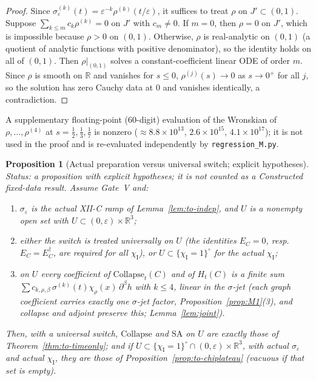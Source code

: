 \documentclass{article}
\newtheorem{proposition}{Proposition}
\theoremstyle{remark}
\newcommand{\sigeps}{\sigma_\varepsilon}
\newcommand{\chiI}{\chi_{\mathrm I}}
\newcommand{\Coll}{\mathrm{Collapse}}
\begin{document}
\begin{proof}
Since $\sigeps^{(k)}(t)=\varepsilon^{-k}\rho^{(k)}(t/\varepsilon)$, it suffices to treat $\rho$ on $J'\subset(0,1)$.
Suppose $\sum_{k\le m}c_k\rho^{(k)}=0$ on $J'$ with $c_m\ne0$.
If $m=0$, then $\rho=0$ on $J'$, which is impossible because $\rho>0$ on $(0,1)$.
Otherwise, $\rho$ is real-analytic on $(0,1)$ (a quotient of analytic functions with positive denominator), so the identity holds on all of $(0,1)$.
Then $\rho|_{(0,1)}$ solves a constant-coefficient linear ODE of order $m$.
Since $\rho$ is smooth on $\mathbb R$ and vanishes for $s\le0$, $\rho^{(j)}(s)\to0$ as $s\to0^+$ for all $j$, so the solution has zero Cauchy data at $0$ and vanishes identically, a contradiction.
\end{proof}
A supplementary floating-point (60-digit) evaluation of the Wronskian of $\rho,\dots,\rho^{(4)}$ at $s=\tfrac12,\tfrac13,\tfrac17$ is nonzero ($\approx8.8\times10^{13}$, $2.6\times10^{15}$, $4.1\times10^{17}$); it is not used in the proof and is re-evaluated independently by \texttt{regression\_M.py}.

\begin{proposition}[Actual preparation versus universal switch; explicit hypotheses]
\label{prop:to-actual}
\emph{Status: a proposition with explicit hypotheses; it is not counted as a Constructed fixed-data result.}
Assume Gate~V and:
\begin{enumerate}
\item[(H1)] $\sigeps$ is the actual XII-C ramp of Lemma~\ref{lem:to-indep}, and $U$ is a nonempty open set with $U\subset(0,\varepsilon)\times\mathbb R^3$;
\item[(H2)] either the switch is treated \emph{universally} on $U$ (the identities $E_C=0$, resp.\ $E_C=E_C^\dagger$, are required for all $\chiI$), or $U\subset\{\chiI=1\}^\circ$ for the actual $\chiI$;
\item[(H3)] on $U$ every coefficient of $\Coll_t(C)$ and of $H_t(C)$ is a finite sum $\sum c_{k,\rho,\beta}\,\sigma^{(k)}(t)\chi_\rho(x)\,\partial^\beta h$ with $k\le4$, linear in the $\sigma$-jet (each graph coefficient carries exactly one $\sigma$-jet factor, Proposition~\ref{prop:M1}(3), and collapse and adjoint preserve this; Lemma~\ref{lem:joint}).
\end{enumerate}
Then, with a universal switch, $\Coll$ and $\mathrm{SA}$ on $U$ are exactly those of Theorem~\ref{thm:to-timeonly}; and if $U\subset\{\chiI=1\}^\circ\cap(0,\varepsilon)\times\mathbb R^3$, with actual $\sigeps$ and actual $\chiI$, they are those of Proposition~\ref{prop:to-chiplateau} (vacuous if that set is empty).
\end{proposition}
\end{document}
